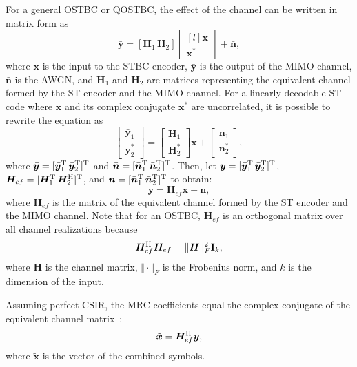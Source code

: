 For a general OSTBC or QOSTBC, the effect of the channel can be written in matrix form as
\[ \bar{\bm{y}} = [\bm{H}_1\,\bm{H}_2] \begin{bmatrix*}[l] \bm{x} \\ \bm{x}^\ast\end{bmatrix*} + \bar{\bm{n}}, \]
where $\bm{x}$ is the input to the STBC encoder, $\bar{\bm{y}}$ is the output of the MIMO channel, $\bar{\bm{n}}$ is the AWGN, and $\bm{H}_1$ and $\bm{H}_2$ are matrices representing the equivalent channel formed by the ST encoder and the MIMO channel. For a linearly decodable ST code where $\bm{x}$ and its complex conjugate $\bm{x}^\ast$ are uncorrelated, it is possible to rewrite the equation as
\[ \begin{bmatrix} \bar{\bm{y}}_1 \\ \bar{\bm{y}}_2^\ast \end{bmatrix} = \begin{bmatrix} \bm{H}_1 \\ \bm{H}_2^\ast \end{bmatrix} \bm{x} + \begin{bmatrix} \bm{n}_1 \\ \bm{n}_2^\ast \end{bmatrix}, \]
where $\bar{\bm{y}}=[\bar{\bm{y}}_1^\text{T}\,\bar{\bm{y}}_2^\text{T}]^\text{T}$ and $\bar{\bm{n}}=[\bar{\bm{n}}_1^\text{T}\,\bar{\bm{n}}_2^\text{T}]^\text{T}$. Then, let $\bm{y}=[\bar{\bm{y}}_1^\text{T}\,\bar{\bm{y}}_2^\text{T}]^\text{T}$, $\bm{H}_{ef}=[\bm{H}_1^\text{T}\,\bm{H}_2^\text{H}]^\text{T}$, and $\bm{n}=[\bar{\bm{n}}_1^\text{T}\,\bar{\bm{n}}_2^\text{T}]^\text{T}$ to obtain:
\begin{equation}
  \bm{y} = \bm{H}_{ef} \bm{x} + \bm{n},
  \label{eq:channel_output}
\end{equation}
where $\bm{H}_{ef}$ is the matrix of the equivalent channel formed by the ST encoder and the MIMO channel. Note that for an OSTBC, $\bm{H}_{ef}$ is an orthogonal matrix over all channel realizations because
\[ \bm{H}_{ef}^\text{H}\bm{H}_{ef} = \Vert\bm{H}\Vert_F^2 \mathbf{I}_k, \]
where $\bm{H}$ is the channel matrix, $\Vert\cdot\Vert_F$ is the Frobenius norm, and $k$ is the dimension of the input.

Assuming perfect CSIR, the MRC coefficients equal the complex conjugate of the equivalent channel matrix~\cite{larsson03,jafarkhani05}:
\begin{equation}
  \tilde{\bm{x}} = \bm{H}_{ef}^\text{H} \bm{y}, \label{eq:mrc}
\end{equation}
where $\tilde{\bm{x}}$ is the vector of the combined symbols.

